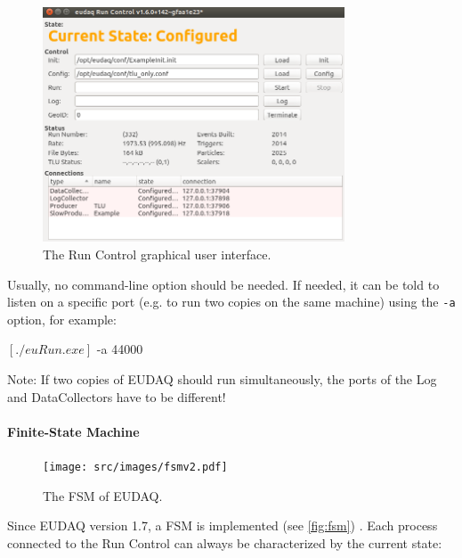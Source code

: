 \begin{figure}[htb]
  \begin{center}
    \includegraphics[width=0.8\textwidth]{src/images/RunControl}
    \caption{The Run Control graphical user interface.}
    \label{fig:RunControl}
  \end{center}
\end{figure}

Usually, no command-line option should be needed. 
If needed, it can be told to listen on a specific port (e.g. to run two copies on the same machine) 
using the \texttt{-a } option, for example:
\begin{listing}[mybash]
$[./euRun.exe]$ -a 44000
\end{listing}
Note: If two copies of EUDAQ should run simultaneously,
the ports of the Log and DataCollectors have to be different!

\paragraph{Finite-State Machine}
\label{sec:fsm}

\begin{figure}
\begin{center}
\texttt{[image: src/images/fsmv2.pdf]}
\end{center}
\caption{The FSM of EUDAQ.}
\label{fig:fsm}
\end{figure}

Since EUDAQ version 1.7, a \gls{FSM} is implemented (see \autoref{fig:fsm}) \cite{Shirokova:2016}.
Each process connected to the Run Control can always be characterized by the current state:

